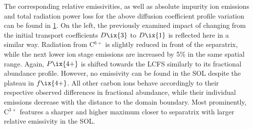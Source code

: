 %
                \begin{figure}[t]%
                    \centering%
                    \begin{minipage}[b]{0.48\textwidth}%
                        \centering%
                    \end{minipage}%
                    \hfill%
                    \begin{minipage}[b]{0.48\textwidth}%
                        \centering%
                    \end{minipage}%
                    \label{fig:rad_ratios_total_103_104}%
                \end{figure}%
%
                The corresponding relative emissivities, as well as absolute impurity ion emissions and total radiation power loss for the above diffusion coefficient profile variation can be found in \cref{fig:rad_ratios_total_103_104}. On the left, the previously examined impact of changing from the initial transport coefficients $D\ix{3}$ to $D\ix{1}$ is reflected here in a similar way. Radiation from C$^{6+}$ is slightly reduced in front of the separatrix, while the next lower ion stage emissions are increased by 5\% in the same spatial range. Again, $P\ix{4+}$ is shifted towards the LCFS similarly to its fractional abundance profile. However, no emissivity can be found in the SOL despite the plateau in $f\ix{4+}$. All other carbon ions behave accordingly to their respective observed differences in fractional abundance, while their individual emissions decrease with the distance to the domain boundary. Most prominently, C$^{3+}$ features a sharper and higher maximum closer to separatrix with larger relative emissivity in the SOL.\\%
